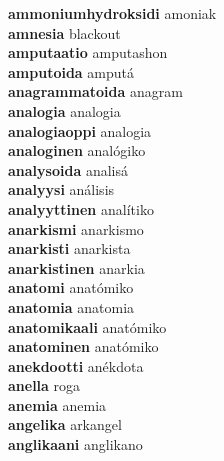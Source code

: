 \textbf{ammoniumhydroksidi } amoniak \\
\textbf{amnesia } blackout \\
\textbf{amputaatio } amputashon \\
\textbf{amputoida } amputá \\
\textbf{anagrammatoida } anagram \\
\textbf{analogia } analogia \\
\textbf{analogiaoppi } analogia \\
\textbf{analoginen } analógiko \\
\textbf{analysoida } analisá \\
\textbf{analyysi } análisis \\
\textbf{analyyttinen } analítiko \\
\textbf{anarkismi } anarkismo \\
\textbf{anarkisti } anarkista \\
\textbf{anarkistinen } anarkia \\
\textbf{anatomi } anatómiko \\
\textbf{anatomia } anatomia \\
\textbf{anatomikaali } anatómiko \\
\textbf{anatominen } anatómiko \\
\textbf{anekdootti } anékdota \\
\textbf{anella } roga \\
\textbf{anemia } anemia \\
\textbf{angelika } arkangel \\
\textbf{anglikaani } anglikano \\
